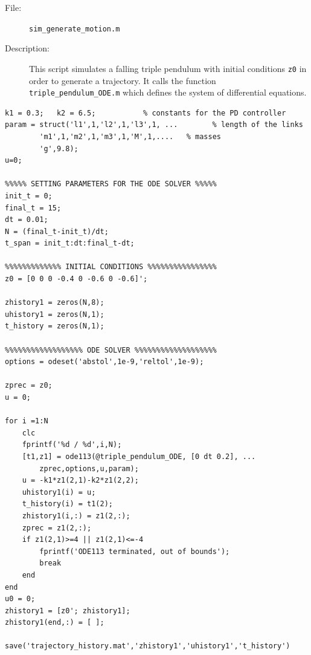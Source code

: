 \documentclass[a4paper,12pt]{article}
\begin{document}
\begin{description}
	\item[File:] \texttt{sim\_generate\_motion.m}
	\item[Description:] This script simulates a falling triple pendulum with initial conditions \texttt{z0} in order to generate a trajectory. It calls the function \texttt{triple\_pendulum\_ODE.m} which defines the system of differential equations.
\end{description}
\begin{lstlisting}[label=code:simgenerate,caption=\texttt{sim\_generate\_motion.m}]
%%%%%%%%% DEFINITIONS OF THE PARAMETERS %%%%%%%%%
k1 = 0.3;   k2 = 6.5;           % constants for the PD controller
param = struct('l1',1,'l2',1,'l3',1, ...        % length of the links
        'm1',1,'m2',1,'m3',1,'M',1,....   % masses
        'g',9.8);
u=0;

%%%%% SETTING PARAMETERS FOR THE ODE SOLVER %%%%%
init_t = 0;
final_t = 15;
dt = 0.01;
N = (final_t-init_t)/dt;
t_span = init_t:dt:final_t-dt;

%%%%%%%%%%%%% INITIAL CONDITIONS %%%%%%%%%%%%%%%%
z0 = [0 0 0 -0.4 0 -0.6 0 -0.6]';

zhistory1 = zeros(N,8);
uhistory1 = zeros(N,1);
t_history = zeros(N,1);

%%%%%%%%%%%%%%%%%% ODE SOLVER %%%%%%%%%%%%%%%%%%%
options = odeset('abstol',1e-9,'reltol',1e-9);

zprec = z0;
u = 0;

for i =1:N
    clc
    fprintf('%d / %d',i,N);
    [t1,z1] = ode113(@triple_pendulum_ODE, [0 dt 0.2], ...
        zprec,options,u,param);
    u = -k1*z1(2,1)-k2*z1(2,2);
    uhistory1(i) = u;
    t_history(i) = t1(2);
    zhistory1(i,:) = z1(2,:);
    zprec = z1(2,:);
    if z1(2,1)>=4 || z1(2,1)<=-4
        fprintf('ODE113 terminated, out of bounds');
        break
    end
end
u0 = 0;
zhistory1 = [z0'; zhistory1];
zhistory1(end,:) = [ ];

save('trajectory_history.mat','zhistory1','uhistory1','t_history')
\end{lstlisting}
\end{document}
